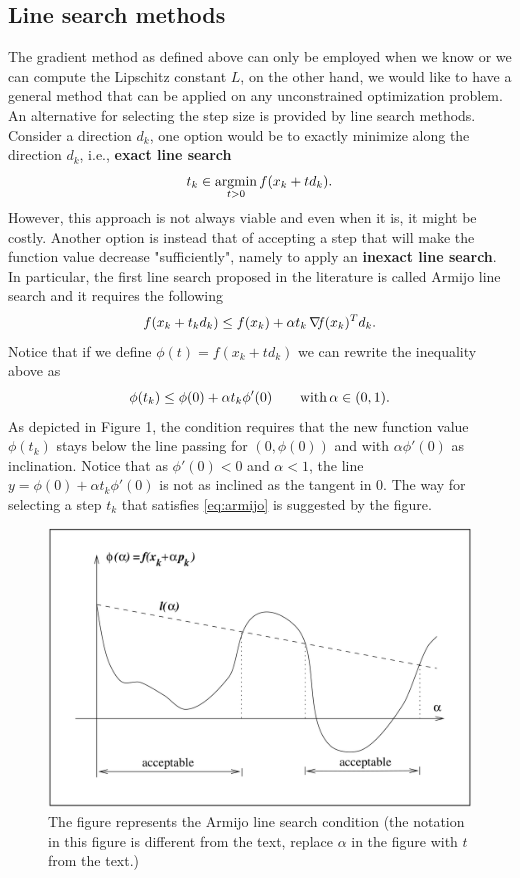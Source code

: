 \documentclass[10pt,a4paper]{article}
\begin{document}
\subsection{Line search methods}
The gradient method as defined above can only be employed when we know or we can compute the Lipschitz constant $L$, on the other hand, we would like to have a general method that can be applied on any unconstrained optimization problem. An alternative for selecting the step size is provided by line search methods. Consider a direction $d_k$, one option would be to exactly minimize along the direction $d_k$, i.e., \textbf{exact line search}
\begin{equation*}
	t_k \in \operatorname*{argmin}_{t>0} f(x_k+t d_k).
\end{equation*}
However, this approach is not always viable and even when it is, it might be costly. Another option is instead that of accepting a step that will make the function value decrease "sufficiently", namely to apply an \textbf{inexact line search}. In particular, the first line search proposed in the literature is called Armijo line search \cite{armijo66a} and it requires the following
\begin{equation}\label{eq:armijo}
	f(x_k +t_k d_k) \leq f(x_k) + \alpha t_k\operatorname*{\mathit{\nabla \!f}}(x_k)^Td_k.
\end{equation}
Notice that if we define $\phi(t)=f(x_k+td_k)$ we can rewrite the inequality above as
\begin{equation*}
\phi(t_k) \leq \phi(0) + \alpha t_k \phi'(0) \qquad \mathord{\mathrm{with }}\, \alpha \in (0,1).
\end{equation*}
As depicted in Figure 1, the condition requires that the new function value $\phi(t_k)$ stays below the line passing for $(0,\phi(0))$ and with $\alpha\phi'(0)$ as inclination. Notice that as $\phi'(0)<0$ and $\alpha<1$, the line $y=\phi(0) +\alpha t_k \phi'(0)$ is not as inclined as the tangent in 0. The way for selecting a step $t_k$ that satisfies \eqref{eq:armijo} is suggested by the figure.
\begin{figure}
	\centering
	\includegraphics[width=0.5\linewidth]{lines}
	\caption{The figure represents the Armijo line search condition (the notation in this figure is different from the text, replace $\alpha$ in the figure with $t$ from the text.)}
\end{figure}
\end{document}
